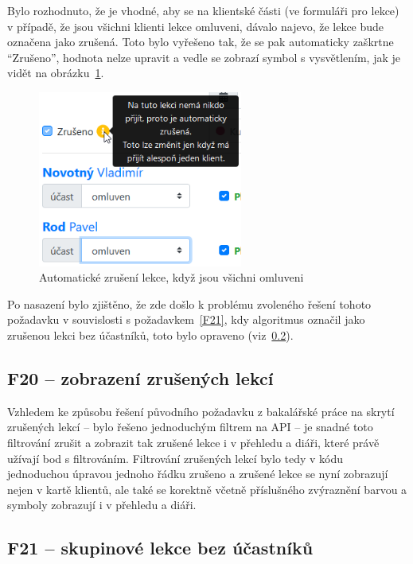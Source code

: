 Bylo rozhodnuto, že je vhodné, aby se na klientské části (ve formuláři pro lekce) v případě, že jsou všichni klienti lekce omluveni, dávalo najevo, že lekce bude označena jako zrušená. Toto bylo vyřešeno tak, že se pak automaticky zaškrtne \enquote{Zrušeno}, hodnota nelze upravit a vedle se zobrazí symbol s vysvětlením, jak je vidět na obrázku~\ref{fig:ui-screen-automatickezruseni}.

\begin{figure}[h]\centering
    \includegraphics[width=0.6\textwidth]{img/ui-screen-automatickezruseni.png}
    \caption{Automatické zrušení lekce, když jsou všichni omluveni}\label{fig:ui-screen-automatickezruseni}
\end{figure}

Po nasazení bylo zjištěno, že zde došlo k problému zvoleného řešení tohoto požadavku v souvislosti s požadavkem~\ref{F21}, kdy algoritmus označil jako zrušenou lekci bez účastníků, toto bylo opraveno (viz~\ref{F21implementace}).

\subsection{F20 -- zobrazení zrušených lekcí}

Vzhledem ke způsobu řešení původního požadavku z bakalářské práce na skrytí zrušených lekcí -- bylo řešeno jednoduchým filtrem na API -- je snadné toto filtrování zrušit a zobrazit tak zrušené lekce i v přehledu a diáři, které právě užívají bod s filtrováním. Filtrování zrušených lekcí bylo tedy v kódu jednoduchou úpravou jednoho řádku zrušeno a zrušené lekce se nyní zobrazují nejen v kartě klientů, ale také se korektně včetně příslušného zvýraznění barvou a symboly zobrazují i v přehledu a diáři.

\subsection{F21 -- skupinové lekce bez účastníků}\label{F21implementace}


